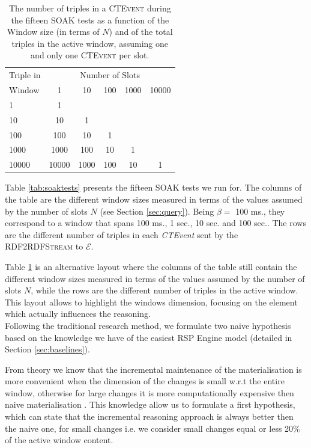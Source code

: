 \begin{table}[htb]
	\centering
	\normalsize
	\begin{tabular}{l | ccccc} %
	  	\hline
		Triple in & \multicolumn{5}{c}{Number of Slots}  \\
		Window  & 1 & 10 & 100 & 1000&10000\\
		\hline
		1  	 & 1\\
		10   & 10  & 1 \\
		100  & 100 & 10 & 1\\
		1000 & 1000& 100& 10& 1\\
		10000& 10000 & 1000& 100& 10& 1\\
		\hline %
	 \end{tabular}
	\caption{The number of triples in a \textsc{CTEvent} during the fifteen SOAK tests as a function of the Window size (in terms of $N$) and of the total triples in the active window, assuming one and only one \textsc{CTEvent} per slot.}
	\label{tab:soaktests-alt}
\end{table}

Table \ref{tab:soaktests} presents the fifteen SOAK tests we run for. The columns of the table are the different window sizes measured in terms of the values assumed by the number of slots $N$ (see Section \ref{sec:query}).  Being $\beta=$ 100 ms., they correspond to a window that spans 100 ms., 1 sec., 10 sec. and 100 sec.. The rows are the different number of triples in each \textit{CTEvent} sent by the \textsc{RDF2RDFStream} to $\mathcal{E}$.%

Table \ref{tab:soaktests-alt} is an alternative layout where the columns of the table still contain the different window sizes measured in terms of the values assumed by the number of slots $N$, while the rows are the different number of triples in the active window. This layout allows to highlight the windows dimension, focusing on the element which actually influences the reasoning.\\

\noindent Following the traditional research method, we formulate two naive hypothesis based on the knowledge we have of the easiest RSP Engine model (detailed in Section \ref{sec:baselines}). 

From theory we know that the incremental maintenance of the materialisation is more convenient when the dimension of the changes is small w.r.t the entire window, otherwise  for large changes it is more computationally expensive then  naive materialisation \cite{DellAglio2014,DBLP:conf/cikm/RenP11,DBLP:conf/semweb/UrbaniMJHB13}.
This knowledge allow us to formulate a first hypothesis, which can state that the incremental reasoning approach is always better then the naive one, for small changes i.e. we consider small changes equal or less 20\% of the active window content.

